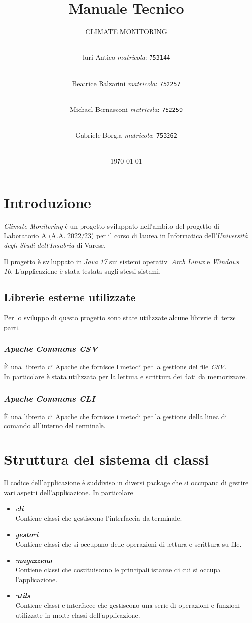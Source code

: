 \documentclass[a4paper, 12pt]{scrreprt}
\title {Manuale Tecnico}
\subtitle{CLIMATE MONITORING}
\author{
	\\Iuri Antico \textsl{matricola}:
	\texttt{753144}
	\and \\
	Beatrice Balzarini \textsl{matricola}:
	\texttt{752257}
	\and \\
	Michael Bernasconi \textsl{matricola}:
	\texttt{752259}
	\and \\
	Gabriele Borgia \textsl{matricola}:
	\texttt{753262}\\\\
	}
\date{\today}
\begin{document}
	\maketitle
	\tableofcontents

	\chapter{Introduzione}
	\textsl{Climate Monitoring} \`e un progetto sviluppato nell’ambito del progetto di Laboratorio A (A.A. 2022/23) per il 
	corso di laurea in Informatica dell’\textsl{Universit\`a degli Studi dell’Insubria} di Varese.
	
	Il progetto \`e sviluppato in \textsl{Java 17} sui sistemi operativi \textsl{Arch Linux} e \textsl{Windows 10}.
	L'applicazione \`e stata testata sugli stessi sistemi.
		\section{Librerie esterne utilizzate}
		Per lo sviluppo di questo progetto sono state utilizzate alcune librerie di terze parti.
			\subsection{\textsl{Apache Commons CSV}}
			\`E una libreria di Apache che fornisce i metodi per la gestione dei file \textsl{CSV}. \\In particolare \`e stata utilizzata per la lettura e scrittura dei dati da memorizzare.
			\subsection{\textsl{Apache Commons CLI}}
			\`E una libreria di Apache che fornisce i metodi per la gestione della linea di comando all'interno del terminale.

	\chapter{Struttura del sistema di classi}
	Il codice dell'applicazione \`e suddiviso in diversi package che si occupano di gestire vari aspetti dell'applicazione. In particolare:
	\begin{itemize}
		\item \textbf{\textsl{cli}}\\Contiene classi che gestiscono l'interfaccia da terminale.
		\item \textbf{\textsl{gestori}}\\Contiene classi che si occupano delle operazioni di lettura e scrittura su file.
		\item \textbf{\textsl{magazzeno}}\\Contiene classi che costituiscono le principali istanze di cui si occupa l'applicazione.
		\item \textbf{\textsl{utils}}\\Contiene classi e interfacce che gestiscono una serie di operazioni e funzioni utilizzate in molte classi dell'applicazione.
	\end{itemize}
	
\end{document}
